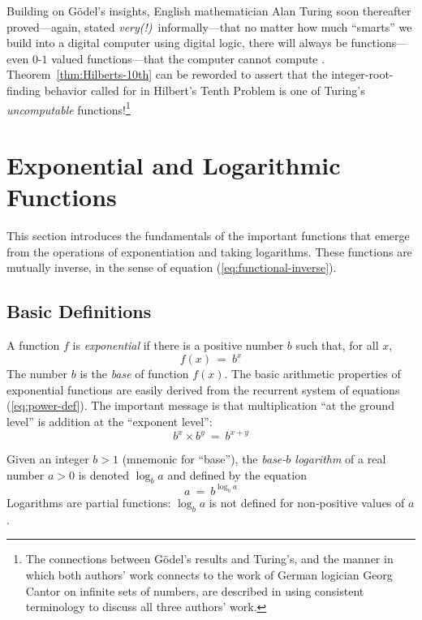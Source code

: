 \noindent
Building on G\"{o}del's insights, English mathematician Alan Turing
 soon thereafter proved---again, stated {\em
  very(!)}~informally---that no matter how much ``smarts'' we build
into a digital computer using digital logic, there will always be
functions---even $0$-$1$ valued functions---that the computer cannot
compute \cite{Turing36}.  Theorem~\ref{thm:Hilberts-10th} can be
reworded to assert that the integer-root-finding behavior called for
in Hilbert's Tenth Problem is one of Turing's {\it uncomputable}
 functions!\footnote{The connections
  between G\"{o}del's results and Turing's, and the manner in which
  both authors' work connects to the work of German logician Georg
  Cantor  on infinite sets of numbers,
  \cite{Cantor74,Cantor78} are described in \cite{Rosenberg09} using
  consistent terminology to discuss all three authors' work.}



\section{Exponential and Logarithmic Functions}
\label{sec:exponential+logarithm}

This section introduces the fundamentals of the important functions
that emerge from the operations of exponentiation and taking
logarithms.  These functions are mutually inverse, in the sense of
equation (\ref{eq:functional-inverse}).

\subsection{Basic Definitions}
\label{sec:exponential-function}

A function $f$ is {\it exponential} if there is a positive number $b$
such that, for all $x$,
\begin{equation}
\label{eq:exponential-defn}
f(x) \ = \ b^x
\end{equation}
The number $b$ is the {\it base} of
function $f(x)$.  The basic arithmetic properties of exponential
functions are easily derived from the recurrent system of equations
(\ref{eq:power-def}).  The important message is that multiplication
``at the ground level'' is addition at the ``exponent level'':
\[ b^x \times b^y \ = \ b^{x+y} \]



Given an integer $b >1$ (mnemonic for ``base''), the {\em base-$b$
  logarithm}
%
of a real number $a > 0$ is denoted $\log_b a$ and defined by the
equation
\begin{equation}
\label{eq:logarithm-defn}
a \ = \ b^{\log_b a}
\end{equation}
Logarithms are partial functions: $\log_b a$ is not defined for
non-positive values of $a$.

